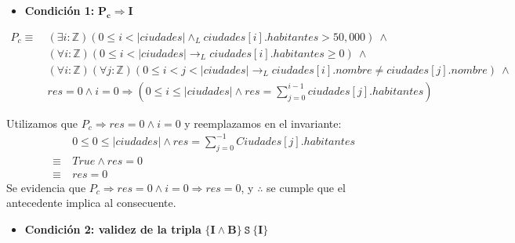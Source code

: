\documentclass[10pt,a4paper]{article}
\begin{document}
\begin{itemize}
\item{\textbf{Condición 1:} $\mathbf{P_c \Rightarrow I}$} \\
\end{itemize}
\begin{equation*}
    \begin{split}
        P_c \equiv \ 
        &(\exists i:\mathbb{Z})(0 \leq i < |ciudades| \land_L ciudades[i].habitantes > 50,000) \ \land \\
        & (\forall i : \mathbb{Z})(0 \leq i < |ciudades| \longrightarrow_L ciudades[i].habitantes \geq 0) \ \land \\
        &(\forall i :\mathbb{Z})(\forall j : \mathbb{Z})(0 \leq i < j < |ciudades| \longrightarrow_L ciudades[i].nombre \ne ciudades[j].nombre) \ \land \\
        & res = 0 \land i = 0 \Longrightarrow (0 \leq i \leq |ciudades| \land res = \sum\limits_{j = 0} ^ {i - 1} ciudades[j].habitantes)
    \end{split}
\end{equation*}

Utilizamos que $P_c \Rightarrow res = 0 \land i = 0$ y reemplazamos en el invariante:
        \begin{equation*}
            \begin{split}
                & \ 0 \leq 0 \leq |ciudades| \land res = \sum\limits_{j = 0} ^ {-1}Ciudades[j].habitantes \\
                \equiv & \ True \land res = 0 \\
                \equiv & \ res = 0
            \end{split}
        \end{equation*}
Se evidencia que $P_c \Rightarrow res = 0 \land i = 0 \Rightarrow res = 0$, y $\therefore$ se cumple que el antecedente implica al consecuente. \\


\begin{itemize}
    \item{\textbf{Condición 2: validez de la tripla} $\mathbf{\{I \land B\} \ \texttt{S} \ \{I\}}$}
\end{itemize}
\end{document}
